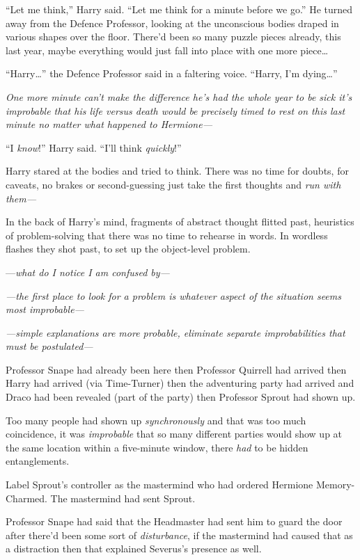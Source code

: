 “Let me think,” Harry said.
“Let me think for a minute before we go.” He turned away from the Defence Professor, looking at the unconscious bodies draped in various shapes over the floor. There’d been so many puzzle pieces already, this last year, maybe everything would just fall into place with one more piece…

“Harry…” the Defence Professor said in a faltering voice.
“Harry, I’m dying…”

\emph{One more minute can’t make the difference he’s had the \emph{whole year} to be sick it’s \emph{improbable} that his life versus death would be precisely timed to rest on this last minute no matter what happened to Hermione—}

“I \emph{know}!” Harry said.
“I’ll think \emph{quickly}!”

Harry stared at the bodies and tried to think. There was no time for doubts, for caveats, no brakes or second-guessing just take the first thoughts and \emph{run with them—}

In the back of Harry’s mind, fragments of abstract thought flitted past, heuristics of problem-solving that there was no time to rehearse in words. In wordless flashes they shot past, to set up the object-level problem.

—\emph{what do I notice I am confused by—}

\emph{—the first place to look for a problem is whatever aspect of the situation seems most improbable—}

\emph{—simple explanations are more probable, eliminate separate improbabilities that must be postulated—}

Professor Snape had already been here then Professor Quirrell had arrived then Harry had arrived (via Time-Turner) then the adventuring party had arrived and Draco had been revealed (part of the party) then Professor Sprout had shown up.

Too many people had shown up \emph{synchronously} and that was too much coincidence, it was \emph{improbable} that so many different parties would show up at the same location within a five-minute window, there \emph{had} to be hidden entanglements.

Label Sprout’s controller as the mastermind who had ordered Hermione Memory-Charmed. The mastermind had sent Sprout.

Professor Snape had said that the Headmaster had sent him to guard the door after there’d been some sort of \emph{disturbance}, if the mastermind had caused that as a distraction then that explained Severus’s presence as well.

